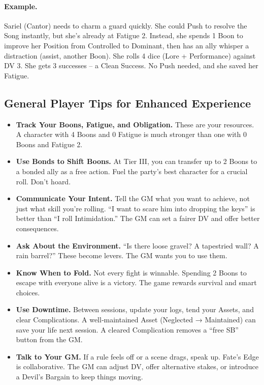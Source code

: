 \paragraph{Example.}
Sariel (Cantor) needs to charm a guard quickly. She could Push to resolve the Song instantly, but she’s already at Fatigue 2. Instead, she spends 1 Boon to improve her Position from Controlled to Dominant, then has an ally whisper a distraction (assist, another Boon). She rolls 4 dice (Lore + Performance) against DV 3. She gets 3 successes – a Clean Success. No Push needed, and she saved her Fatigue.

\subsection{General Player Tips for Enhanced Experience}

\begin{itemize}
  \item \textbf{Track Your Boons, Fatigue, and Obligation.} These are your resources. A character with 4 Boons and 0 Fatigue is much stronger than one with 0 Boons and Fatigue 2.
  \item \textbf{Use Bonds to Shift Boons.} At Tier III, you can transfer up to 2 Boons to a bonded ally as a free action. Fuel the party’s best character for a crucial roll. Don’t hoard.
  \item \textbf{Communicate Your Intent.} Tell the GM what you want to achieve, not just what skill you’re rolling. “I want to scare him into dropping the keys” is better than “I roll Intimidation.” The GM can set a fairer DV and offer better consequences.
  \item \textbf{Ask About the Environment.} “Is there loose gravel? A tapestried wall? A rain barrel?” These become levers. The GM wants you to use them.
  \item \textbf{Know When to Fold.} Not every fight is winnable. Spending 2 Boons to escape with everyone alive is a victory. The game rewards survival and smart choices.
  \item \textbf{Use Downtime.} Between sessions, update your logs, tend your Assets, and clear Complications. A well‑maintained Asset (Neglected → Maintained) can save your life next session. A cleared Complication removes a “free SB” button from the GM.
  \item \textbf{Talk to Your GM.} If a rule feels off or a scene drags, speak up. Fate’s Edge is collaborative. The GM can adjust DV, offer alternative stakes, or introduce a Devil’s Bargain to keep things moving.
\end{itemize}

